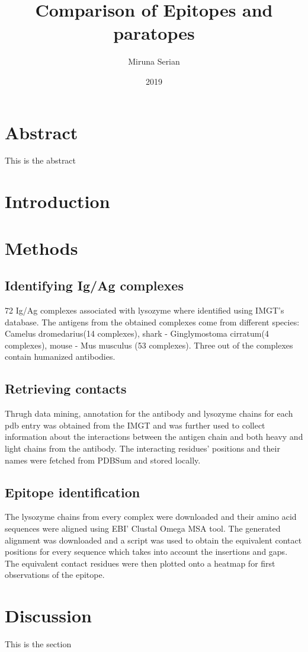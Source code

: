 \documentclass{article}
\begin{document}
\title{Comparison of Epitopes and paratopes}

\author{Miruna Serian}
\date{2019}
\maketitle
\newpage 

\section*{Abstract}
\markright{}
This is the abstract
\section{Introduction}
\markright{}
\newpage 
\section{Methods}
\subsection{Identifying Ig/Ag complexes}
 72 Ig/Ag complexes associated with lysozyme where identified using IMGT's database. The antigens from the obtained complexes come from different species: Camelus dromedarius(14 complexes), shark - Ginglymostoma cirratum(4 complexes), mouse - Mus musculus (53 complexes). Three out of the complexes contain humanized antibodies.
 
\subsection{Retrieving contacts}
Thrugh data mining, annotation for the antibody and lysozyme chains for each pdb entry was obtained from the IMGT and was further used to collect information about the interactions between the antigen chain and both heavy and light chains from the antibody. The interacting residues' positions and their names were fetched from PDBSum and stored locally.

\subsection{Epitope identification}
The lysozyme chains from every complex were downloaded and their amino acid sequences were aligned using EBI' Clustal Omega MSA tool. The generated alignment was downloaded and a script was used to obtain the equivalent contact positions for every sequence which takes into account the insertions and gaps. The equivalent contact residues were then plotted onto a heatmap for first observations of the epitope. 


\section*{Discussion}

This is the section
\end{document}
